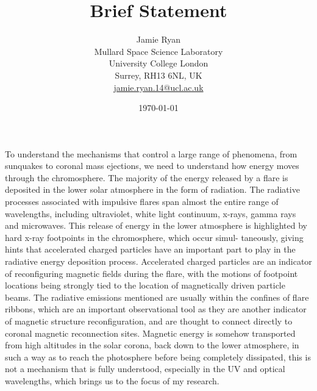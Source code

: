 \documentclass[10pt]{article}
\begin{document}
\title{Brief Statement}
\author{Jamie Ryan \\ 
Mullard Space Science Laboratory \\
University College London \\
Surrey, RH13 6NL, UK\\
\href{mailto:jamie.ryan.14@ucl.ac.uk}{jamie.ryan.14@ucl.ac.uk} \\
\date{\today}
}
\maketitle



To understand the mechanisms that control a large range of phenomena, from sunquakes to coronal mass ejections, we
need to understand how energy moves through the chromosphere. The majority of the energy released by a flare is deposited
in the lower solar atmosphere in the form of radiation. The radiative processes associated with impulsive flares span almost
the entire range of wavelengths, including ultraviolet, white light continuum, x-rays, gamma rays and microwaves. This
release of energy in the lower atmosphere is highlighted by hard x-ray footpoints in the chromosphere, which occur simul-
taneously, giving hints that accelerated charged particles have an important part to play in the radiative energy deposition
process. Accelerated charged particles are an indicator of reconfiguring magnetic fields during the flare, with the motions
of footpoint locations being strongly tied to the location of magnetically driven particle beams. The radiative emissions
mentioned are usually within the confines of flare ribbons, which are an important observational tool as they are another
indicator of magnetic structure reconfiguration, and are thought to connect directly to coronal magnetic reconnection sites.
Magnetic energy is somehow transported from high altitudes in the solar corona, back down to the lower atmosphere, in
such a way as to reach the photosphere before being completely dissipated, this is not a mechanism that is fully understood,
especially in the UV and optical wavelengths, which brings us to the focus of my research. \\
\end{document}
